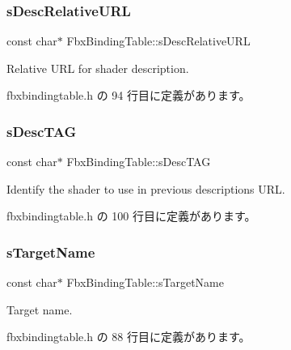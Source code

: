 \subsubsection{\texorpdfstring{s\+Desc\+Relative\+U\+RL}{sDescRelativeURL}}
{\footnotesize\ttfamily const char$\ast$ Fbx\+Binding\+Table\+::s\+Desc\+Relative\+U\+RL\hspace{0.3cm}{\ttfamily [static]}}



Relative U\+RL for shader description. 



 fbxbindingtable.\+h の 94 行目に定義があります。

\mbox{\label{class_fbx_binding_table_a0536e5bee95808c32640c75fab26db61}} 
\subsubsection{\texorpdfstring{s\+Desc\+T\+AG}{sDescTAG}}
{\footnotesize\ttfamily const char$\ast$ Fbx\+Binding\+Table\+::s\+Desc\+T\+AG\hspace{0.3cm}{\ttfamily [static]}}



Identify the shader to use in previous description\textquotesingle{}s U\+RL. 



 fbxbindingtable.\+h の 100 行目に定義があります。

\mbox{\label{class_fbx_binding_table_aa49dfec94118aab9dafba3e1032cc8d5}} 
\subsubsection{\texorpdfstring{s\+Target\+Name}{sTargetName}}
{\footnotesize\ttfamily const char$\ast$ Fbx\+Binding\+Table\+::s\+Target\+Name\hspace{0.3cm}{\ttfamily [static]}}



Target name. 



 fbxbindingtable.\+h の 88 行目に定義があります。

